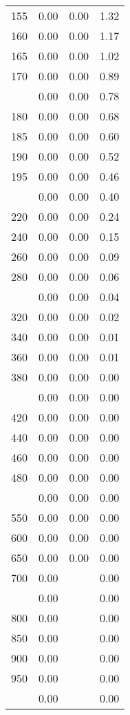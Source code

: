 \begin{table}[ht]
\begin{tabular}{lccc}
  155 & 0.00 & 0.00 & 1.32 \\ 
  160 & 0.00 & 0.00 & 1.17 \\ 
  165 & 0.00 & 0.00 & 1.02 \\ 
  170 & 0.00 & 0.00 & 0.89 \\ 
   \addlinespace
175 & 0.00 & 0.00 & 0.78 \\ 
  180 & 0.00 & 0.00 & 0.68 \\ 
  185 & 0.00 & 0.00 & 0.60 \\ 
  190 & 0.00 & 0.00 & 0.52 \\ 
  195 & 0.00 & 0.00 & 0.46 \\ 
   \addlinespace
200 & 0.00 & 0.00 & 0.40 \\ 
  220 & 0.00 & 0.00 & 0.24 \\ 
  240 & 0.00 & 0.00 & 0.15 \\ 
  260 & 0.00 & 0.00 & 0.09 \\ 
  280 & 0.00 & 0.00 & 0.06 \\ 
   \addlinespace
300 & 0.00 & 0.00 & 0.04 \\ 
  320 & 0.00 & 0.00 & 0.02 \\ 
  340 & 0.00 & 0.00 & 0.01 \\ 
  360 & 0.00 & 0.00 & 0.01 \\ 
  380 & 0.00 & 0.00 & 0.00 \\ 
   \addlinespace
400 & 0.00 & 0.00 & 0.00 \\ 
  420 & 0.00 & 0.00 & 0.00 \\ 
  440 & 0.00 & 0.00 & 0.00 \\ 
  460 & 0.00 & 0.00 & 0.00 \\ 
  480 & 0.00 & 0.00 & 0.00 \\ 
   \addlinespace
500 & 0.00 & 0.00 & 0.00 \\ 
  550 & 0.00 & 0.00 & 0.00 \\ 
  600 & 0.00 & 0.00 & 0.00 \\ 
  650 & 0.00 & 0.00 & 0.00 \\ 
  700 & 0.00 &  & 0.00 \\ 
   \addlinespace
750 & 0.00 &  & 0.00 \\ 
  800 & 0.00 &  & 0.00 \\ 
  850 & 0.00 &  & 0.00 \\ 
  900 & 0.00 &  & 0.00 \\ 
  950 & 0.00 &  & 0.00 \\ 
   \addlinespace
1000 & 0.00 &  & 0.00 \\ 
   \bottomrule
\end{tabular}
\end{table}
